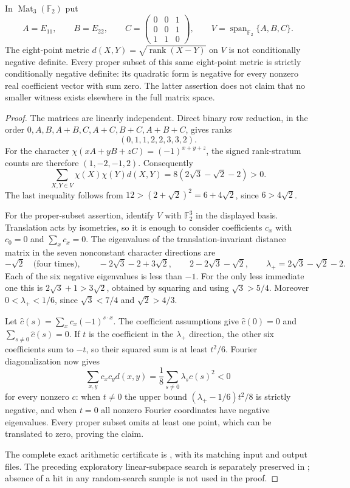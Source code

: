 \begin{proposition}
\label{prop:eight-point-cnd}
In $\operatorname{Mat}_3(\mathbb F_2)$ put
\[
 A=E_{11},\qquad B=E_{22},\qquad
 C=\begin{pmatrix}0&0&1\\0&0&1\\1&1&0\end{pmatrix},
 \qquad V=\operatorname{span}_{\mathbb F_2}\{A,B,C\}.
\]
The eight-point metric $d(X,Y)=\sqrt{\operatorname{rank}(X-Y)}$
on $V$ is not conditionally negative definite.  Every proper subset
of this same eight-point metric is strictly conditionally negative
definite: its quadratic form is negative for every nonzero real
coefficient vector with sum zero.  The latter assertion does not
claim that no smaller witness exists elsewhere in the full matrix space.
\end{proposition}
\begin{proof}
The matrices are linearly independent.  Direct binary row reduction,
in the order $0,A,B,A+B,C,A+C,B+C,A+B+C$, gives ranks
\[
 (0,1,1,2,2,3,3,2).
\]
For the character $\chi(xA+yB+zC)=(-1)^{x+y+z}$, the signed
rank-stratum counts are therefore $(1,-2,-1,2)$.  Consequently
\[
 \sum_{X,Y\in V}\chi(X)\chi(Y)d(X,Y)
 =8(2\sqrt3-\sqrt2-2)>0.
\]
The last inequality follows from
$12>(2+\sqrt2)^2=6+4\sqrt2$, since $6>4\sqrt2$.

For the proper-subset assertion, identify $V$ with $\mathbb F_2^3$
in the displayed basis.  Translation acts by isometries, so it is
enough to consider coefficients $c_x$ with $c_0=0$ and
$\sum_xc_x=0$.  The eigenvalues of the translation-invariant
distance matrix in the seven nonconstant character directions are
\[
 -\sqrt2\quad\text{(four times)},\qquad
 -2\sqrt3-2+3\sqrt2,\qquad
 2-2\sqrt3-\sqrt2,\qquad
 \lambda_+=2\sqrt3-\sqrt2-2.
\]
Each of the six negative eigenvalues is less than $-1$.
For the only less immediate one this is
$2\sqrt3+1>3\sqrt2$, obtained by squaring and using
$\sqrt3>5/4$.  Moreover
$0<\lambda_+<1/6$, since $\sqrt3<7/4$ and $\sqrt2>4/3$.

Let $\widehat c(s)=\sum_xc_x(-1)^{s\cdot x}$.
The coefficient assumptions give $\widehat c(0)=0$ and
$\sum_{s\ne0}\widehat c(s)=0$.  If $t$ is the coefficient in
the $\lambda_+$ direction, the other six coefficients sum to
$-t$, so their squared sum is at least $t^2/6$.  Fourier
diagonalization now gives
\[
 \sum_{x,y}c_xc_yd(x,y)
 =\frac18\sum_{s\ne0}\lambda_s\widehat c(s)^2<0
\]
for every nonzero $c$: when $t\ne0$ the upper bound
$(\lambda_+-1/6)t^2/8$ is strictly negative, and when $t=0$
all nonzero Fourier coordinates have negative eigenvalues.
Every proper subset omits at least one point, which can be
translated to zero, proving the claim.

The complete exact arithmetic certificate is
, with its matching input
and output files.  The preceding exploratory linear-subspace
search is separately preserved in
; absence of a hit in any
random-search sample is not used in the proof.
\end{proof}

